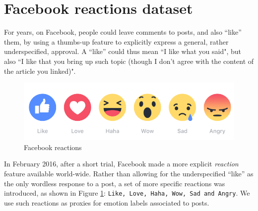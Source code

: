\documentclass[11pt]{article}
\begin{document}





\section{Facebook reactions dataset}
\label{sec:FBData}



For years, on Facebook, people could leave comments to posts, and also ``like'' them, by using a thumbs-up feature to explicitly express a general, rather underspecified, approval. A ``like'' could thus mean ``I like what you said", but also ``I like that you bring up such topic (though I don't agree with the content of the article you linked)". 
\begin{figure}
  \includegraphics[scale=.2]{reactions-image-en_us.png}
  \caption{Facebook reactions}
  \label{fig:facebook_reactions}
\end{figure}
In February 2016, after a short trial, Facebook made a more explicit \textit{reaction} feature available world-wide. Rather than allowing for the underspecified ``like'' as the only wordless response to a post, a set of more specific reactions was introduced, as shown in Figure \ref{fig:facebook_reactions}: \texttt{Like, Love, Haha, Wow, Sad and Angry}. We use such reactions as proxies for emotion labels associated to posts.
\end{document}
